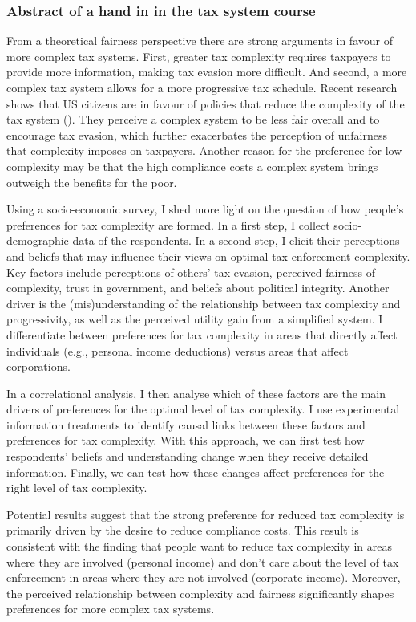 \documentclass[a4paper, 12pt]{article}
\begin{document}
\subsubsection{Abstract of a hand in in the tax system course}
From a theoretical fairness perspective there are strong arguments in favour of more complex tax systems. First, greater tax complexity requires taxpayers to provide more information, making tax evasion more difficult. And second, a more complex tax system allows for a more progressive tax schedule. Recent research shows that US citizens are in favour of policies that reduce the complexity of the tax system (\cite{benzarti2024rising}). They perceive a complex system to be less fair overall and to encourage tax evasion, which further exacerbates the perception of unfairness that complexity imposes on taxpayers. Another reason for the preference for low complexity may be that the high compliance costs a complex system brings outweigh the benefits for the poor. 

Using a socio-economic survey, I shed more light on the question of how people's preferences for tax complexity are formed. In a first step, I collect socio-demographic data of the respondents. In a second step, I elicit their perceptions and beliefs that may influence their views on optimal tax enforcement complexity. Key factors include perceptions of others' tax evasion, perceived fairness of complexity, trust in government, and beliefs about political integrity. Another driver is the (mis)understanding of the relationship between tax complexity and progressivity, as well as the perceived utility gain from a simplified system. I differentiate between preferences for tax complexity in areas that directly affect individuals (e.g., personal income deductions) versus areas that affect corporations.

In a correlational analysis, I then analyse which of these factors are the main drivers of preferences for the optimal level of tax complexity. I use experimental information treatments to identify causal links between these factors and preferences for tax complexity. With this approach, we can first test how respondents' beliefs and understanding change when they receive detailed information. Finally, we can test how these changes affect preferences for the right level of tax complexity.

Potential results suggest that the strong preference for reduced tax complexity is primarily driven by the desire to reduce compliance costs. This result is consistent with the finding that people want to reduce tax complexity in areas where they are involved (personal income) and don't care about the level of tax enforcement in areas where they are not involved (corporate income). Moreover, the perceived relationship between complexity and fairness significantly shapes preferences for more complex tax systems.
\end{document}
